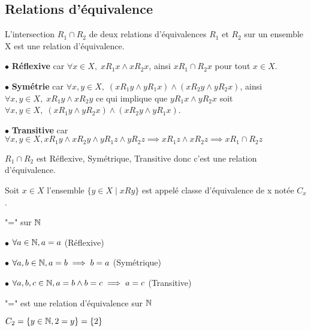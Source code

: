 \documentclass[a4paper, 12pt]{article}
\begin{document}
\subsection{Relations d'équivalence}

\begin{proposition}
    L'intersection $R_1 \cap R_2$ de deux relations d'équivalences $R_1$ et $R_2$ sur un ensemble X est une relation d'équivalence.
\end{proposition}

\begin{demonstration}
    \item $\bullet$ \textbf{Réflexive} car $\forall x \in X, \; x R_1 x \land x R_2 x$, ainsi $x R_1 \cap R_2 x$ pour tout $x \in X$.
    \item $\bullet$ \textbf{Symétrie} car $\forall x, y \in X, \; (x R_1 y \land y R_1 x) \land (x R_2 y \land y R_2 x)$, ainsi $\forall x, y \in X, \; x R_1 y \land x R_2 y$ ce qui implique que $y R_1 x \land y R_2 x$
    soit $\forall x, y \in X, \; (x R_1 y \land y R_2 x) \land (x R_2 y \land y R_1 x)$.
    \item $\bullet$ \textbf{Transitive} car $\forall x, y \in X, x R_1 y \land x R_2 y \land y R_1 z \land y R_2 z \implies xR_1z \land xR_2z \implies x R_1 \cap R_2 z$
    
    \begin{rdem}
        $R_1 \cap R_2$ est Réflexive, Symétrique, Transitive donc c'est une relation d'équivalence.
    \end{rdem}
\end{demonstration}




Soit $x \in X$ l'ensemble $\{y \in X \mid xRy\}$ est appelé classe d'équivalence
de x notée $C_x$.

\begin{example}
    "=" sur $\mathbb{N}$

    \item $\bullet$ $\forall a \in \mathbb{N}, a = a$ (Réflexive)
    \item $\bullet$ $\forall a, b \in \mathbb{N}, a = b \implies b = a$ (Symétrique)
    \item $\bullet$ $\forall a, b, c \in \mathbb{N}, a = b \land b = c \implies a = c$ (Transitive)

    "=" est une relation d'équivalence sur $\mathbb{N}$

    $C_2 = \{y \in \mathbb{N}, 2 = y\} = \{2\}$
\end{example}
\end{document}
